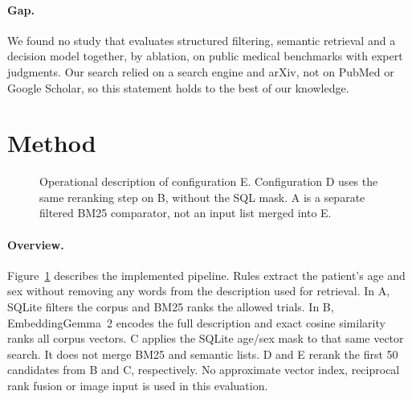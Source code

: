 \documentclass{article}
\begin{document}
\paragraph{Gap.} We found no study that evaluates structured filtering, semantic retrieval and a decision model together, by ablation, on public medical benchmarks with expert judgments. Our search relied on a search engine and arXiv, not on PubMed or Google Scholar, so this statement holds to the best of our knowledge.

\section{Method}
\label{sec:method}

\begin{figure}[t]
  \centering
  \caption{Operational description of configuration E. Configuration D uses the same reranking step on B, without the SQL mask. A is a separate filtered BM25 comparator, not an input list merged into E.}
  \label{fig:architecture}
\end{figure}

\paragraph{Overview.} Figure~\ref{fig:architecture} describes the implemented pipeline. Rules extract the patient's age and sex without removing any words from the description used for retrieval. In A, SQLite filters the corpus and BM25 ranks the allowed trials. In B, EmbeddingGemma~2 encodes the full description and exact cosine similarity ranks all corpus vectors. C applies the SQLite age/sex mask to that same vector search. It does not merge BM25 and semantic lists. D and E rerank the first 50 candidates from B and C, respectively. No approximate vector index, reciprocal rank fusion or image input is used in this evaluation.
\end{document}
